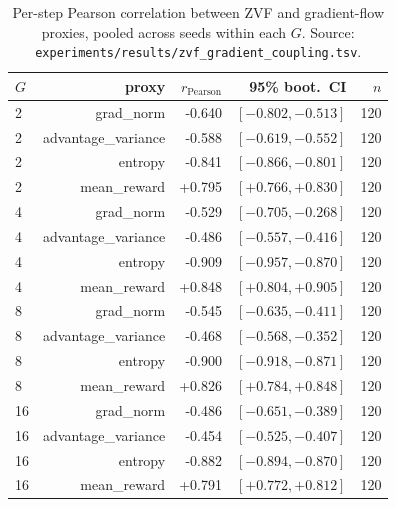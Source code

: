 %


\begin{table}[htbp]
\centering
\small
\begin{tabular}{lrrrr}
\toprule
$G$ & proxy & $r_{\text{Pearson}}$ & 95\% boot.\ CI & $n$ \\
\midrule
2 & grad_norm & -0.640 & $[-0.802, -0.513]$ & 120 \\
2 & advantage_variance & -0.588 & $[-0.619, -0.552]$ & 120 \\
2 & entropy & -0.841 & $[-0.866, -0.801]$ & 120 \\
2 & mean_reward & +0.795 & $[+0.766, +0.830]$ & 120 \\
4 & grad_norm & -0.529 & $[-0.705, -0.268]$ & 120 \\
4 & advantage_variance & -0.486 & $[-0.557, -0.416]$ & 120 \\
4 & entropy & -0.909 & $[-0.957, -0.870]$ & 120 \\
4 & mean_reward & +0.848 & $[+0.804, +0.905]$ & 120 \\
8 & grad_norm & -0.545 & $[-0.635, -0.411]$ & 120 \\
8 & advantage_variance & -0.468 & $[-0.568, -0.352]$ & 120 \\
8 & entropy & -0.900 & $[-0.918, -0.871]$ & 120 \\
8 & mean_reward & +0.826 & $[+0.784, +0.848]$ & 120 \\
16 & grad_norm & -0.486 & $[-0.651, -0.389]$ & 120 \\
16 & advantage_variance & -0.454 & $[-0.525, -0.407]$ & 120 \\
16 & entropy & -0.882 & $[-0.894, -0.870]$ & 120 \\
16 & mean_reward & +0.791 & $[+0.772, +0.812]$ & 120 \\
\bottomrule
\end{tabular}
\caption{Per-step Pearson correlation between ZVF and gradient-flow proxies, pooled across seeds within each $G$. Source: \texttt{experiments/results/zvf\_gradient\_coupling.tsv}.}
\label{tab:zvf-gradient-coupling}
\end{table}
